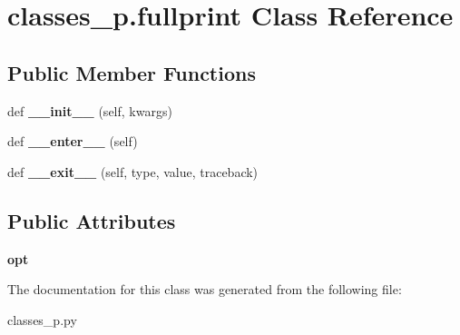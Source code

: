 \hypertarget{classclasses__p_1_1fullprint}{}\section{classes\+\_\+p.\+fullprint Class Reference}
\label{classclasses__p_1_1fullprint}
\subsection*{Public Member Functions}
\begin{DoxyCompactItemize}
\item 
\mbox{\label{classclasses__p_1_1fullprint_a1a8b5bb00603a50e29f22e2ebf3666e0}} 
def {\bfseries \+\_\+\+\_\+init\+\_\+\+\_\+} (self, kwargs)
\item 
\mbox{\label{classclasses__p_1_1fullprint_a031781e381b07bf43acd722df3e8e8fa}} 
def {\bfseries \+\_\+\+\_\+enter\+\_\+\+\_\+} (self)
\item 
\mbox{\label{classclasses__p_1_1fullprint_a2882d8046c486ad71f0be8f1529a2f0d}} 
def {\bfseries \+\_\+\+\_\+exit\+\_\+\+\_\+} (self, type, value, traceback)
\end{DoxyCompactItemize}
\subsection*{Public Attributes}
\begin{DoxyCompactItemize}
\item 
\mbox{\label{classclasses__p_1_1fullprint_a6aecfacaafe2dc0b96d1857eec8325ce}} 
{\bfseries opt}
\end{DoxyCompactItemize}


The documentation for this class was generated from the following file\+:\begin{DoxyCompactItemize}
\item 
classes\+\_\+p.\+py\end{DoxyCompactItemize}
